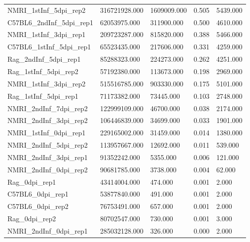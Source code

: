 \documentclass{article}
\begin{document}
\begin{table}[H]
\begin{tabular}{*5l}
NMRI\_1stInf\_5dpi\_rep2 & 316721928.000 & 1609009.000 & 0.505 & 5439.000 \\ 
C57BL6\_2ndInf\_5dpi\_rep1 & 62053975.000 & 311900.000 & 0.500 & 4610.000 \\ 
	{\color{Gray}NMRI\_1stInf\_3dpi\_rep1} & {\color{Gray}209723287.000} &  {\color{Gray}815820.000} &  {\color{Gray}0.388} &  {\color{Gray}5466.000} \\ 
C57BL6\_1stInf\_5dpi\_rep1 & 65523435.000 & 217606.000 & 0.331 & 4259.000 \\ 
Rag\_2ndInf\_5dpi\_rep1 & 85288323.000 & 224273.000 & 0.262 & 4251.000 \\ 
Rag\_1stInf\_5dpi\_rep2 & 57192380.000 & 113673.000 & 0.198 & 2969.000 \\ 
NMRI\_1stInf\_3dpi\_rep2 & 515516785.000 & 903330.000 & 0.175 & 5101.000 \\ 
Rag\_1stInf\_5dpi\_rep1 & 71173382.000 & 73445.000 & 0.103 & 2748.000 \\ 
NMRI\_2ndInf\_7dpi\_rep2 & 122999109.000 & 46700.000 & 0.038 & 2174.000 \\ 
NMRI\_2ndInf\_3dpi\_rep2 & 106446839.000 & 34699.000 & 0.033 & 1901.000 \\ 
	 {\color{Gray}NMRI\_1stInf\_0dpi\_rep1} &  {\color{Gray}229165002.000} & {\color{Gray} 31459.000} &  {\color{Gray}0.014} & {\color{Gray} 1380.000} \\ 
NMRI\_2ndInf\_5dpi\_rep2 & 113957667.000 & 12692.000 & 0.011 & 539.000 \\ 
NMRI\_2ndInf\_3dpi\_rep1 & 91352242.000 & 5355.000 & 0.006 & 121.000 \\ 
NMRI\_2ndInf\_0dpi\_rep2 & 90681785.000 & 3738.000 & 0.004 & 62.000 \\ 
Rag\_0dpi\_rep1 & 43414004.000 & 474.000 & 0.001 & 2.000 \\ 
C57BL6\_0dpi\_rep1 & 53877840.000 & 491.000 & 0.001 & 2.000 \\ 
C57BL6\_0dpi\_rep2 & 76753491.000 & 657.000 & 0.001 & 2.000 \\ 
Rag\_0dpi\_rep2 & 80702547.000 & 730.000 & 0.001 & 3.000 \\ 
NMRI\_2ndInf\_0dpi\_rep1 & 285032128.000 & 326.000 & 0.000 & 2.000 \\ 
\bottomrule
\hline
\end{tabular}
\end{table}




\end{document}
